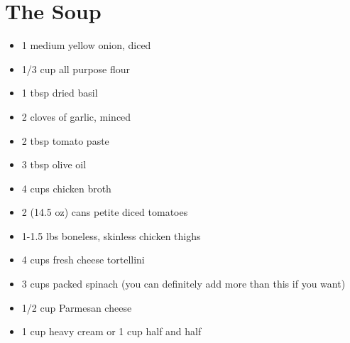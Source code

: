 \section{The Soup}

\begin{itemize}
\item 1 medium yellow onion, diced
\item 1/3 cup all purpose flour
\item 1 tbsp dried basil
\item 2 cloves of garlic, minced
\item 2 tbsp tomato paste
\item 3 tbsp olive oil
\item 4 cups chicken broth
\item 2 (14.5 oz) cans petite diced tomatoes
\item 1-1.5 lbs boneless, skinless chicken thighs
\item 4 cups fresh cheese tortellini
\item 3 cups packed spinach (you can definitely add more than this if you want)
\item 1/2 cup Parmesan cheese
\item 1 cup heavy cream or 1 cup half and half
\end{itemize}

